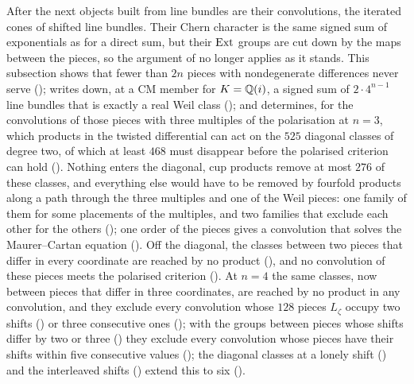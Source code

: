 After  the next objects built from line bundles are their
convolutions, the iterated cones of shifted line bundles. Their Chern
character is the same signed sum of exponentials as for a direct sum, but
their $\operatorname{Ext}$ groups are cut down by the maps between the pieces, so the
argument of  no longer applies as it stands. This
subsection shows that fewer than $2n$ pieces with nondegenerate differences
never serve (); writes down, at a CM member for
$K=\mathbb{Q}(i)$, a signed sum of $2\cdot4^{n-1}$ line bundles that is exactly a
real Weil class (); and determines, for the
convolutions of those pieces with three multiples of the polarisation at
$n=3$, which products in the twisted differential can act on the $525$
diagonal classes of degree two, of which at least $468$ must disappear
before the polarised criterion can hold (). Nothing
enters the diagonal, cup products remove at most $276$ of these classes, and
everything else would have to be removed by fourfold products along a path
through the three multiples and one of the Weil pieces: one family of them
for some placements of the multiples, and two families that exclude each
other for the others (); one order of the pieces
gives a convolution that solves the Maurer--Cartan equation
(). Off the diagonal, the classes between two
pieces that differ in every coordinate are reached by no product
(), and no
convolution of these pieces meets the polarised criterion
(). At $n=4$ the same classes, now between pieces
that differ in three coordinates, are reached by no product in any
convolution, and they exclude every convolution whose $128$ pieces
$L_{\zeta}$ occupy two shifts () or three
consecutive ones (); with the groups between
pieces whose shifts differ by two or three () they
exclude every convolution whose pieces have their shifts within five
consecutive values (); the diagonal classes at a lonely
shift () and the interleaved shifts
() extend this to six ().

